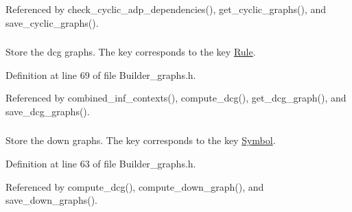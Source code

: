 Referenced by check\_\-cyclic\_\-adp\_\-dependencies(), get\_\-cyclic\_\-graphs(), and save\_\-cyclic\_\-graphs().

\hypertarget{classgenevalmag_1_1Builder__graphs_afe54574f0045851288fae27ce01a8f4f}{
\subsubsection[{p\_\-Dcg\_\-graphs}]{}}
\label{classgenevalmag_1_1Builder__graphs_afe54574f0045851288fae27ce01a8f4f}


Store the dcg graphs. The key corresponds to the key \hyperlink{classgenevalmag_1_1Rule}{Rule}. 



Definition at line 69 of file Builder\_\-graphs.h.



Referenced by combined\_\-inf\_\-contexts(), compute\_\-dcg(), get\_\-dcg\_\-graph(), and save\_\-dcg\_\-graphs().

\hypertarget{classgenevalmag_1_1Builder__graphs_a05fcf30d7286884794303103544979c4}{
\subsubsection[{p\_\-Down\_\-graphs}]{}}
\label{classgenevalmag_1_1Builder__graphs_a05fcf30d7286884794303103544979c4}


Store the down graphs. The key corresponds to the key \hyperlink{classgenevalmag_1_1Symbol}{Symbol}. 



Definition at line 63 of file Builder\_\-graphs.h.



Referenced by compute\_\-dcg(), compute\_\-down\_\-graph(), and save\_\-down\_\-graphs().

